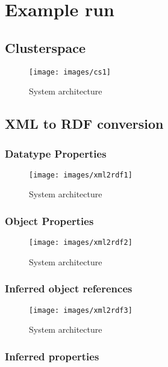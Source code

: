 \documentclass[journal]{IEEEtran}
\begin{document}
\section{Example run}

\subsection{Clusterspace}

\begin{figure*}[h]
    \centering
    \texttt{[image: images/cs1]}
    \caption{System architecture}
    \label{fig:cs1}
\end{figure*}

\subsection{XML to RDF conversion}

\subsubsection{Datatype Properties}

\begin{figure*}[h]
    \centering
    \texttt{[image: images/xml2rdf1]}
    \caption{System architecture}
    \label{fig:xml2rdf1}
\end{figure*}

\subsubsection{Object Properties}

\begin{figure*}[h]
    \centering
    \texttt{[image: images/xml2rdf2]}
    \caption{System architecture}
    \label{fig:xml2rdf2}
\end{figure*}

\subsubsection{Inferred object references}
\begin{figure*}[h]
    \centering
    \texttt{[image: images/xml2rdf3]}
    \caption{System architecture}
    \label{fig:xml2rdf3}
\end{figure*}


\subsubsection{Inferred properties}
\end{document}

